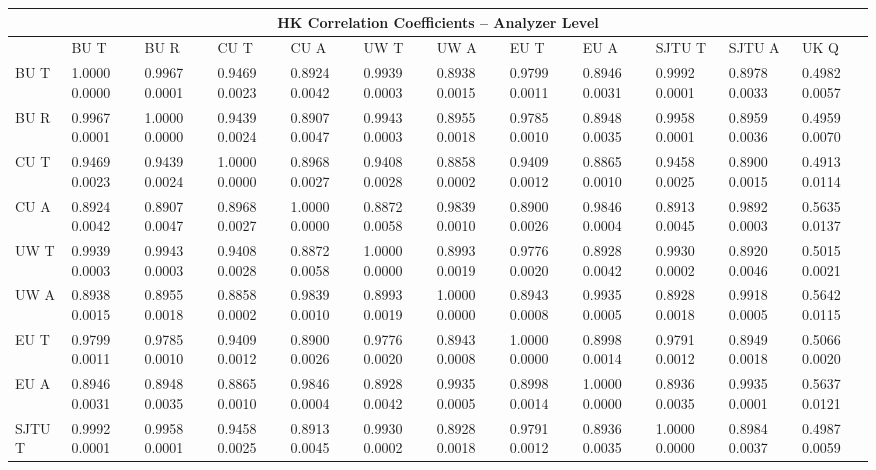 \begin{landscape}
\begin{table}
\small
\centering
\renewcommand{\arraystretch}{1.5}
\begin{tabularx}{1\linewidth}{@{\extracolsep{\fill}}lXXXXXXXXXXX}
  \toprule
  	\multicolumn{12}{c}{{\normalsize HK Correlation Coefficients -- Analyzer Level}} \\
  \midrule
  	       & BU T & BU R & CU T & CU A & UW T & UW A & EU T & EU A & SJTU T & SJTU A & UK Q \\
  \midrule
	BU T   & 1.0000 0.0000 & 0.9967 0.0001 & 0.9469 0.0023 & 0.8924 0.0042 & 0.9939 0.0003 & 0.8938 0.0015 & 0.9799 0.0011 & 0.8946 0.0031 & 0.9992 0.0001 & 0.8978 0.0033 & 0.4982 0.0057  \\
	BU R   & 0.9967 0.0001 & 1.0000 0.0000 & 0.9439 0.0024 & 0.8907 0.0047 & 0.9943 0.0003 & 0.8955 0.0018 & 0.9785 0.0010 & 0.8948 0.0035 & 0.9958 0.0001 & 0.8959 0.0036 & 0.4959 0.0070  \\
	CU T   & 0.9469 0.0023 & 0.9439 0.0024 & 1.0000 0.0000 & 0.8968 0.0027 & 0.9408 0.0028 & 0.8858 0.0002 & 0.9409 0.0012 & 0.8865 0.0010 & 0.9458 0.0025 & 0.8900 0.0015 & 0.4913 0.0114  \\
	CU A   & 0.8924 0.0042 & 0.8907 0.0047 & 0.8968 0.0027 & 1.0000 0.0000 & 0.8872 0.0058 & 0.9839 0.0010 & 0.8900 0.0026 & 0.9846 0.0004 & 0.8913 0.0045 & 0.9892 0.0003 & 0.5635 0.0137  \\
	UW T   & 0.9939 0.0003 & 0.9943 0.0003 & 0.9408 0.0028 & 0.8872 0.0058 & 1.0000 0.0000 & 0.8993 0.0019 & 0.9776 0.0020 & 0.8928 0.0042 & 0.9930 0.0002 & 0.8920 0.0046 & 0.5015 0.0021  \\
	UW A   & 0.8938 0.0015 & 0.8955 0.0018 & 0.8858 0.0002 & 0.9839 0.0010 & 0.8993 0.0019 & 1.0000 0.0000 & 0.8943 0.0008 & 0.9935 0.0005 & 0.8928 0.0018 & 0.9918 0.0005 & 0.5642 0.0115  \\
	EU T   & 0.9799 0.0011 & 0.9785 0.0010 & 0.9409 0.0012 & 0.8900 0.0026 & 0.9776 0.0020 & 0.8943 0.0008 & 1.0000 0.0000 & 0.8998 0.0014 & 0.9791 0.0012 & 0.8949 0.0018 & 0.5066 0.0020  \\
	EU A   & 0.8946 0.0031 & 0.8948 0.0035 & 0.8865 0.0010 & 0.9846 0.0004 & 0.8928 0.0042 & 0.9935 0.0005 & 0.8998 0.0014 & 1.0000 0.0000 & 0.8936 0.0035 & 0.9935 0.0001 & 0.5637 0.0121  \\
	SJTU T & 0.9992 0.0001 & 0.9958 0.0001 & 0.9458 0.0025 & 0.8913 0.0045 & 0.9930 0.0002 & 0.8928 0.0018 & 0.9791 0.0012 & 0.8936 0.0035 & 1.0000 0.0000 & 0.8984 0.0037 & 0.4987 0.0059  \\

\end{tabularx}
\end{table}
\end{landscape}
